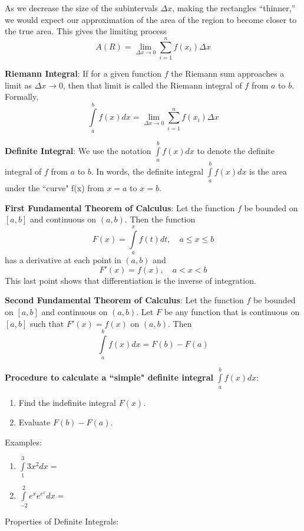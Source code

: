 \documentclass[]{book}
\providecommand{\tightlist}{%
  \setlength{\itemsep}{0pt}\setlength{\parskip}{0pt}}
\theoremstyle{definition}
\theoremstyle{definition}
\theoremstyle{definition}
\theoremstyle{remark}
\begin{document}
As we decrease the size of the subintervals \(\Delta x\), making the
rectangles ``thinner,'' we would expect our approximation of the area of
the region to become closer to the true area. This gives the limiting
process
\[A(R)=\lim\limits_{\Delta x\to 0}\sum\limits_{i=1}^n f(x_i)\Delta x\]

\textbf{Riemann Integral}: If for a given function \(f\) the Riemann sum
approaches a limit as \(\Delta x \to 0\), then that limit is called the
Riemann integral of \(f\) from \(a\) to \(b\). Formally,
\[\int\limits_a^b f(x) dx= \lim\limits_{\Delta x\to 0} \sum\limits_{i=1}^n f(x_i)\Delta x\]

\textbf{Definite Integral}: We use the notation
\(\int\limits_a^b f(x) dx\) to denote the definite integral of \(f\)
from \(a\) to \(b\). In words, the definite integral
\(\int\limits_a^b f(x)dx\) is the area under the ``curve" f(x) from
\(x=a\) to \(x=b\).

\textbf{First Fundamental Theorem of Calculus}: Let the function \(f\)
be bounded on \([a,b]\) and continuous on \((a,b)\). Then the function
\[F(x)=\int\limits_a^x f(t)dt, \quad a\le x\le b\] has a derivative at
each point in \((a,b)\) and \[F'(x)=f(x), \quad a<x<b\] This last point
shows that differentiation is the inverse of integration.

\textbf{Second Fundamental Theorem of Calculus}: Let the function \(f\)
be bounded on \([a,b]\) and continuous on \((a,b)\). Let \(F\) be any
function that is continuous on \([a,b]\) such that \(F'(x)=f(x)\) on
\((a,b)\). Then \[\int\limits_a^bf(x)dx = F(b)-F(a)\]

\textbf{Procedure to calculate a ``simple" definite integral}
\(\int\limits_a^b f(x)dx\):

\begin{enumerate}
\def\labelenumi{\arabic{enumi}.}
\tightlist
\item
  Find the indefinite integral \(F(x)\).
\item
  Evaluate \(F(b)-F(a)\).
\end{enumerate}

\begin{framed}
Examples:
\begin{enumerate}
        \item $\int\limits_1^3 3x^2 dx=  $
        \item $\int\limits_{-2}^2 e^x e^{e^x} dx =$
\end{enumerate}
\end{framed}

Properties of Definite Integrals:
\end{document}
